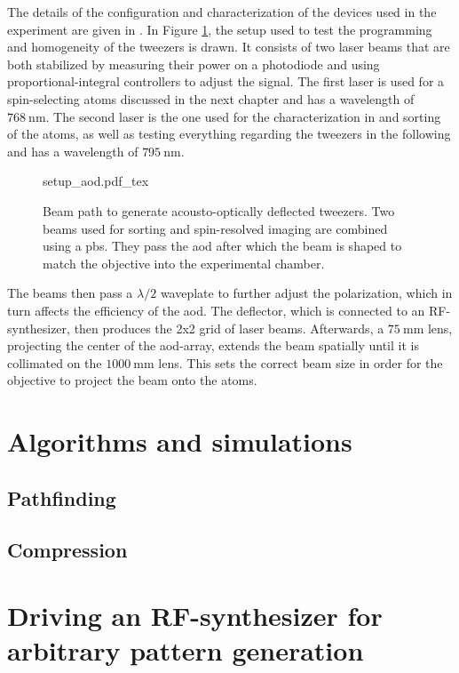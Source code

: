 The details of the configuration and characterization of the devices used in the experiment are given in \cite{Osterholz2020}.
In Figure \ref{fig:setup_aod}, the setup used to test the programming and homogeneity of the tweezers is drawn. It consists of two laser beams that are both stabilized by measuring their power on a photodiode and using proportional-integral controllers to adjust the signal. The first laser is used for a spin-selecting atoms discussed in the next chapter and has a wavelength of $\SI{768}{\nano\meter}$. The second laser is the one used for the characterization in \cite{Osterholz2020} and sorting of the atoms, as well as testing everything regarding the tweezers in the following and has a wavelength of $\SI{795}{\nano\meter}$.

\begin{figure}[t]
\label{fig:setup_aod}
\centering
	{setup_aod.pdf_tex}
	\caption{Beam path to generate acousto-optically deflected tweezers. Two beams used for sorting and spin-resolved imaging are combined using a \ac{pbs}. They pass the \ac{aod} after which the beam is shaped to match the objective into the experimental chamber.}
\end{figure}

The beams then pass a $\lambda/2$ waveplate to further adjust the polarization, which in turn affects the efficiency of the \ac{aod}. The deflector, which is connected to an RF-synthesizer, then produces the 2x2 grid of laser beams. Afterwards, a $\SI{75}{\milli\meter}$ lens, projecting the center of the \ac{aod}-array, extends the beam spatially until it is collimated on the $\SI{1000}{\milli\meter}$ lens. This sets the correct beam size in order for the objective to project the beam onto the atoms.

\section{Algorithms and simulations}
\subsection{Pathfinding}
\subsection{Compression}

\section{Driving an RF-synthesizer for arbitrary pattern generation}

